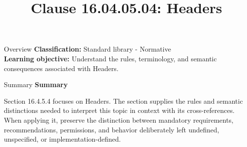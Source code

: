 \documentclass[10pt,letterpaper]{article}
\title{Clause 16.04.05.04: Headers}
\author{}
\date{}
\begin{document}
\maketitle
\begin{CornellOverviewBox}{Overview}
\textbf{Classification:} Standard library - Normative\\[2pt]
\textbf{Learning objective:} Understand the rules, terminology, and semantic consequences associated with Headers.
\end{CornellOverviewBox}\begin{CornellSummaryBox}{Summary}
{\sffamily\bfseries\color{Accent} Summary}\par\vspace{3pt}Section 16.4.5.4 focuses on Headers. The section supplies the rules and semantic distinctions needed to interpret this topic in context with its cross-references. When applying it, preserve the distinction between mandatory requirements, recommendations, permissions, and behavior deliberately left undefined, unspecified, or implementation-defined.
\end{CornellSummaryBox}
\end{document}

